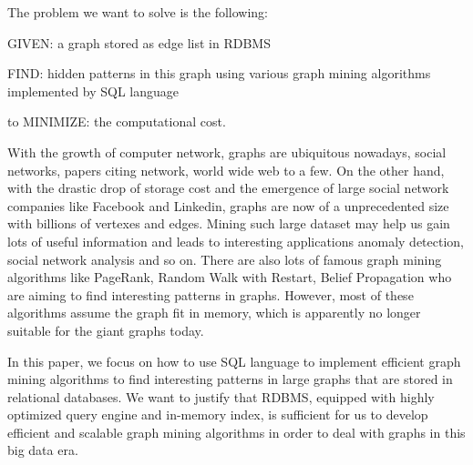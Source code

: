 
The problem we want to solve is the following:
\bit
\item GIVEN: a graph stored as edge list in RDBMS
\item FIND: hidden patterns in this graph using various graph mining algorithms implemented by SQL language
\item to MINIMIZE: the computational cost.
\eit

With the growth of computer network, graphs are ubiquitous nowadays, social networks, papers citing network, world wide web to a few. On the other hand, with the drastic drop of storage cost and the emergence of large social network companies like Facebook and Linkedin, graphs are now of a unprecedented size with billions of vertexes and edges. Mining such large dataset may help us gain lots of useful information and leads to interesting applications anomaly detection, social network analysis and so on. There are also lots of famous graph mining algorithms like PageRank, Random Walk with Restart, Belief Propagation who are aiming to find interesting patterns in graphs. However, most of these algorithms assume the graph fit in memory, which is apparently no longer suitable for the giant graphs today.

In this paper, we focus on how to use SQL language to implement efficient graph mining algorithms to find interesting patterns in large graphs that are stored in relational databases. We want to justify that RDBMS, equipped with highly optimized query engine and in-memory index, is sufficient for us to develop efficient and scalable graph mining algorithms in order to deal with graphs in this big data era.  

